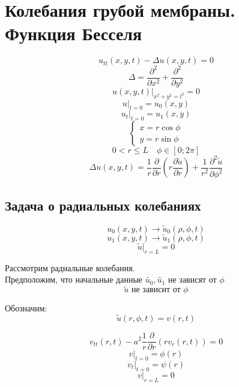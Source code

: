 \documentclass[a4paper]{article}
\begin{document}
\section*{\centering Колебания грубой мембраны. Функция Бесселя}

\begin{equation}
    u_{tt}(x,y,t) - \Delta u(x,y,t) = 0
\end{equation}
\[
    \Delta = \frac{\partial^{2}}{\partial x^2} + \frac{\partial^{2}}{\partial y^2}
\]
\begin{equation}
    u(x,y,t) |_{x^2 + y^2 = l^2} = 0
\end{equation}
\begin{equation}
    u |_{t=0} = u_0(x,y)
\end{equation}
\begin{equation}
    u_t |_{t=0} = u_1(x,y)
\end{equation}
\begin{equation}
    \begin{cases}
        x = r \cos \phi\\
        y = r\sin \phi
    \end{cases}
\end{equation}
\[
    0 < r \leq L \quad \phi \in [0; 2\pi]
\]
\[
    \Delta u(x,y,t) = \frac{1}{r} \frac{\partial}{\partial r} \left( r 
        \frac{\partial \widetilde{u}}{\partial r}\right) + \frac{1}{r^2} 
         \frac{\partial^2 \widetilde{u}}{\partial \phi^2}
\]

\subsection*{Задача о радиальных колебаниях}
\[
    u_0(x,y,t) \to \widetilde{u}_0(\rho, \phi, t)
\]
\[
    u_1(x,y,t) \to \widetilde{u}_1(\rho, \phi, t)
\]
\[
    \widetilde{u} |_{r=L} = 0
\]

Рассмотрим радиальные колебания.\\
Предположим, что начальные данные $ \widetilde{u_0}, \widetilde{u_1} $
не зависят от $ \phi $ 
\[
    \widetilde{u} \text{ не зависит от } \phi
\]

Обозначим:
\[
    \widetilde{u}(r, \phi, t) = v(r,t)
\]

\begin{equation}
    v_{t t}(r,t) - a^2 \frac{1}{r}\frac{\partial}{\partial r} ( r v_r(r,t)) = 0
\end{equation}
\begin{equation}
    v |_{t=0} = \phi(r)
\end{equation}
\begin{equation}
    v_t |_{t=0} = \psi(r)
\end{equation}
\begin{equation}
    v |_{r = L} = 0
\end{equation}
\end{document}
